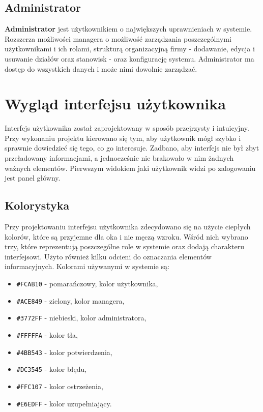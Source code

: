 \subsection{Administrator}

\textbf{Administrator} jest użytkownikiem o największych uprawnieniach w systemie. Rozszerza możliwości managera o możliwość zarządzania poszczególnymi użytkownikami i ich rolami, strukturą organizacyjną firmy - dodawanie, edycja i usuwanie działów oraz stanowisk - oraz konfigurację systemu. Administrator ma dostęp do wszystkich danych i może nimi dowolnie zarządzać.

\section{Wygląd interfejsu użytkownika}

Interfejs użytkownika został zaprojektowany w sposób przejrzysty i intuicyjny. Przy wykonaniu projektu kierowano się tym, aby użytkownik mógł szybko i sprawnie dowiedzieć się tego, co go interesuje. Zadbano, aby interfejs nie był zbyt przeładowany informacjami, a jednocześnie nie brakowało w nim żadnych ważnych elementów. Pierwszym widokiem jaki użytkownik widzi po zalogowaniu jest panel główny.

\subsection{Kolorystyka}

Przy projektowaniu interfejsu użytkownika zdecydowano się na użycie ciepłych kolorów, które są przyjemne dla oka i nie męczą wzroku. Wśród nich wybrano trzy, które reprezentują poszczególne role w systemie oraz dodają charakteru interfejsowi. Użyto również kilku odcieni do oznaczania elementów informacyjnych. Kolorami używanymi w systemie są:
\begin{itemize}
    \item \texttt{\#FCAB10} - pomarańczowy, kolor użytkownika,
    \item \texttt{\#ACE849} - zielony, kolor managera,
    \item \texttt{\#3772FF} - niebieski, kolor administratora,
    \item \texttt{\#FFFFFA} - kolor tła,
    \item \texttt{\#4BB543} - kolor potwierdzenia,
    \item \texttt{\#DC3545} - kolor błędu,
    \item \texttt{\#FFC107} - kolor ostrzeżenia,
    \item \texttt{\#E6EDFF} - kolor uzupełniający.
\end{itemize}

